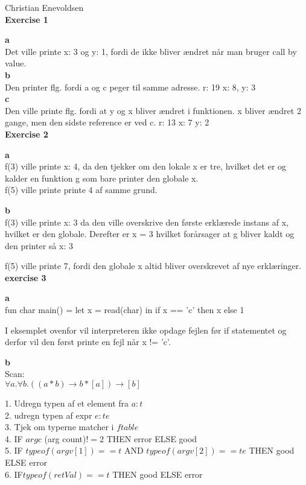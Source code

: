 \documentclass[12pt,a4paper]{article}
\begin{document}
\newpage

Christian Enevoldsen\\

\textbf{Exercise 1}

\textbf{a}\\
Det ville printe x: 3 og y: 1, fordi de ikke bliver ændret når man bruger call by value.\\


\textbf{b}\\
Den printer flg. fordi a og c peger til samme adresse.
r: 19
x: 8, y: 3\\

\textbf{c}\\
Den ville printe flg. fordi at y og x bliver ændret i funktionen. x bliver ændret 2 gange, men den sidste reference er ved c.
r: 13
x: 7
y: 2\\

\textbf{Exercise 2}

\textbf{a}\\
f(3) ville printe x: 4, da den tjekker om den lokale x er tre, hvilket det er og kalder en funktion g som bare printer den globale x.\\

f(5) ville printe printe 4 af samme grund.

\textbf{b}\\
f(3) ville printe x: 3 da den ville overskrive den første erklærede instans af x, hvilket er den globale. Derefter er x = 3 hvilket forårsager at g bliver kaldt og den printer så x: 3

f(5) ville printe 7, fordi den globale x altid bliver overskrevet af nye erklæringer.\\

\textbf{exercise 3}

\textbf{a}\\
fun char main() =
  let x = read(char) in
    if x == 'c' then x else 1

I eksemplet ovenfor vil interpreteren ikke opdage fejlen før if statementet og derfor vil den først printe en fejl når x != 'c'.

\textbf{b} \\

Scan: \\
$\forall a . \forall b. ((a * b) \rightarrow b * [a]) \rightarrow [b] $

1. Udregn typen af et element fra $a: t$\\
2. udregn typen af expr $e: te$ \\
3. Tjek om typerne matcher i $ftable$ \\	
4. IF $argc$ (arg count)$!= 2$ THEN error ELSE good\\
5. IF $typeof(argv[1]) == t $ AND $ typeof(argv[2]) == te$ THEN good ELSE error\\
6. IF$ typeof(retVal) == t $ THEN good ELSE error\\
\end{document}

